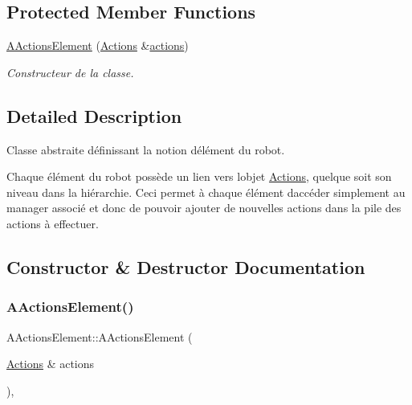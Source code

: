 \subsection*{Protected Member Functions}
\begin{DoxyCompactItemize}
\item 
\hyperlink{classAActionsElement_aad97382a1ccb0a1ea4181d47c4a2ec4e}{A\+Actions\+Element} (\hyperlink{classActions}{Actions} \&\hyperlink{classAActionsElement_a3fbd5b8201049a59602d8b7201a9ef8a}{actions})
\begin{DoxyCompactList}\small\item\em Constructeur de la classe. \end{DoxyCompactList}\end{DoxyCompactItemize}


\subsection{Detailed Description}
Classe abstraite définissant la notion d\textquotesingle{}élément du robot. 

Chaque élément du robot possède un lien vers l\textquotesingle{}objet \hyperlink{classActions}{Actions}, quelque soit son niveau dans la hiérarchie. Ceci permet à chaque élément d\textquotesingle{}accéder simplement au manager associé et donc de pouvoir ajouter de nouvelles actions dans la pile des actions à effectuer. 

\subsection{Constructor \& Destructor Documentation}
\mbox{\label{classAActionsElement_aad97382a1ccb0a1ea4181d47c4a2ec4e}} 
\subsubsection{\texorpdfstring{A\+Actions\+Element()}{AActionsElement()}}
{\footnotesize\ttfamily A\+Actions\+Element\+::\+A\+Actions\+Element (\begin{DoxyParamCaption}\item[{\hyperlink{classActions}{Actions} \&}]{actions }\end{DoxyParamCaption})\hspace{0.3cm}{\ttfamily [inline]}, {\ttfamily [protected]}}



